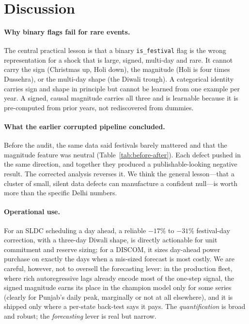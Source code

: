 \documentclass[11pt]{article}
\newcommand{\pct}{\%}
\begin{document}
\section{Discussion}
\label{sec:discussion}

\paragraph{Why binary flags fail for rare events.} The central practical lesson is
that a binary \texttt{is\_festival} flag is the wrong representation for a shock
that is large, signed, multi-day and rare. It cannot carry the sign (Christmas up,
Holi down), the magnitude (Holi is four times Dussehra), or the multi-day shape
(the Diwali trough). A categorical identity carries sign and shape in principle but
cannot be learned from one example per year. A signed, causal magnitude carries
all three and is learnable because it is pre-computed from prior years, not
rediscovered from dummies.

\paragraph{What the earlier corrupted pipeline concluded.} Before the audit, the
same data said festivals barely mattered and that the magnitude feature was
neutral (Table~\ref{tab:before-after}). Each defect pushed in the same direction,
and together they produced a publishable-looking negative result. The corrected
analysis reverses it. We think the general lesson---that a cluster of small,
silent data defects can manufacture a confident null---is worth more than the
specific Delhi numbers.

\paragraph{Operational use.} For an SLDC scheduling a day ahead, a reliable
$-17\pct$ to $-31\pct$ festival-day correction, with a three-day Diwali shape, is
directly actionable for unit commitment and reserve sizing; for a DISCOM, it sizes
day-ahead power purchase on exactly the days when a mis-sized forecast is most
costly. We are careful, however, not to oversell the forecasting lever: in the
production fleet, where rich autoregressive lags already encode most of the
one-step signal, the signed magnitude earns its place in the champion model only
for some series (clearly for Punjab's daily peak, marginally or not at all
elsewhere), and it is shipped only where a per-state back-test says it pays. The
\emph{quantification} is broad and robust; the \emph{forecasting} lever is real
but narrow.
\end{document}
